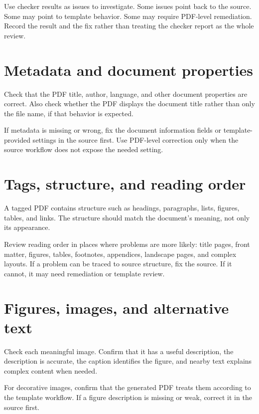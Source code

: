 Use checker results as issues to investigate. Some issues point back to the source. Some may point to template behavior. Some may require PDF-level remediation. Record the result and the fix rather than treating the checker report as the whole review.

\section{Metadata and document properties}
\label{sec:metadata-document-properties}

Check that the PDF title, author, language, and other document properties are correct. Also check whether the PDF displays the document title rather than only the file name, if that behavior is expected.

If metadata is missing or wrong, fix the document information fields or template-provided settings in the source first. Use PDF-level correction only when the source workflow does not expose the needed setting.

\section{Tags, structure, and reading order}
\label{sec:tags-structure-reading-order}

A tagged PDF contains structure such as headings, paragraphs, lists, figures, tables, and links. The structure should match the document's meaning, not only its appearance.

Review reading order in places where problems are more likely: title pages, front matter, figures, tables, footnotes, appendices, landscape pages, and complex layouts. If a problem can be traced to source structure, fix the source. If it cannot, it may need remediation or template review.

\section{Figures, images, and alternative text}
\label{sec:figures-alt-text-pdf-review}

Check each meaningful image. Confirm that it has a useful description, the description is accurate, the caption identifies the figure, and nearby text explains complex content when needed.

For decorative images, confirm that the generated PDF treats them according to the template workflow. If a figure description is missing or weak, correct it in the source first.

